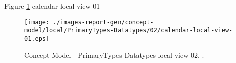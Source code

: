 Figure \ref{fig:lu.uni.lassy.excalibur.standard.specification.libraries-CM-view-local-PrimaryTypes-Datatypes-02} calendar-local-view-01



\begin{figure}[htbp] 
\label{fig:lu.uni.lassy.excalibur.standard.specification.libraries-CM}
\begin{center}
\texttt{[image: ./images-report-gen/concept-model/local/PrimaryTypes-Datatypes/02/calendar-local-view-01.eps]}
\end{center}
\caption[Concept Model - PrimaryTypes-Datatypes local view 02 - ]{Concept Model - PrimaryTypes-Datatypes local view 02. .}
\label{fig:lu.uni.lassy.excalibur.standard.specification.libraries-CM-view-local-PrimaryTypes-Datatypes-02}
\end{figure}
\vspace{0.5cm} 
